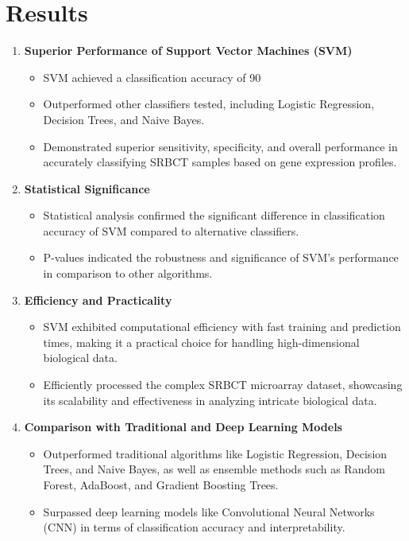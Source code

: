 \documentclass{article}
\begin{document}
\section{Results}
\begin{enumerate}
\item \textbf{Superior Performance of Support Vector Machines (SVM)}
\begin{itemize}
\item SVM achieved a classification accuracy of 90%
\item Outperformed other classifiers tested, including Logistic Regression, Decision Trees, and Naive Bayes.
\item Demonstrated superior sensitivity, specificity, and overall performance in accurately classifying SRBCT samples based on gene expression profiles.
\end{itemize}

\item \textbf{Statistical Significance}
\begin{itemize}
    \item Statistical analysis confirmed the significant difference in classification accuracy of SVM compared to alternative classifiers.
    \item P-values indicated the robustness and significance of SVM's performance in comparison to other algorithms.
\end{itemize}

\item \textbf{Efficiency and Practicality}
\begin{itemize}
    \item SVM exhibited computational efficiency with fast training and prediction times, making it a practical choice for handling high-dimensional biological data.
    \item Efficiently processed the complex SRBCT microarray dataset, showcasing its scalability and effectiveness in analyzing intricate biological data.
\end{itemize}

\item \textbf{Comparison with Traditional and Deep Learning Models}
\begin{itemize}
    \item Outperformed traditional algorithms like Logistic Regression, Decision Trees, and Naive Bayes, as well as ensemble methods such as Random Forest, AdaBoost, and Gradient Boosting Trees.
    \item Surpassed deep learning models like Convolutional Neural Networks (CNN) in terms of classification accuracy and interpretability.
\end{itemize}

\end{enumerate}
\end{document}
